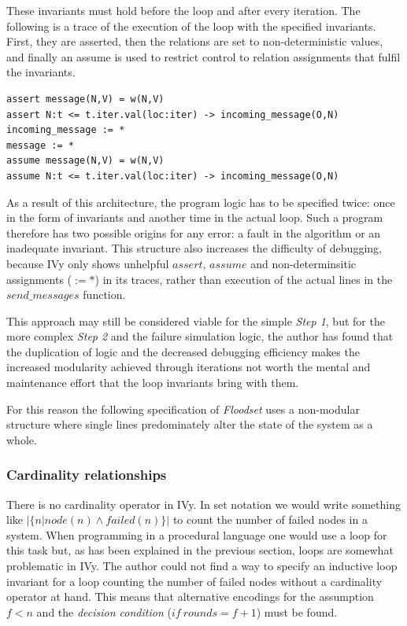\documentclass[fleqn]{article}
\begin{document}
These invariants must hold before the loop and after every iteration. The following is a trace of the execution of the loop with the specified invariants. First, they are asserted, then the relations are set to non-deterministic values, and finally an assume is used to restrict control to relation assignments that fulfil the invariants.

\begin{mdframed}[nobreak=true, backgroundcolor=light-gray, roundcorner=10pt,leftmargin=1, rightmargin=1, innerleftmargin=15, innertopmargin=15,innerbottommargin=15, outerlinewidth=1, linecolor=light-gray]
\begin{lstlisting}
assert message(N,V) = w(N,V)
assert N:t <= t.iter.val(loc:iter) -> incoming_message(O,N)
incoming_message := *
message := *
assume message(N,V) = w(N,V)
assume N:t <= t.iter.val(loc:iter) -> incoming_message(O,N)
\end{lstlisting}
\end{mdframed}

As a result of this architecture, the program logic has to be specified twice: once in the form of invariants and another time in the actual loop. Such a program therefore has two possible origins for any error: a fault in the algorithm or an inadequate invariant. This structure also increases the difficulty of debugging, because IVy only shows unhelpful $assert$, $assume$ and  non-determinsitic assignments ($:= *$) in its traces, rather than execution of the actual lines in the $send\_messages$ function.

This approach may still be considered viable for the simple \textit{Step 1}, but for the more complex \textit{Step 2} and the failure simulation logic, the author has found that the duplication of logic and the decreased debugging efficiency makes the increased modularity achieved through iterations not worth the mental and maintenance effort that the loop invariants bring with them.

For this reason the following specification of \textit{Floodset} uses a non-modular structure where single lines predominately alter the state of the system as a whole.


\subsubsection{Cardinality relationships}
There is no cardinality operator in IVy. In set notation we would write something like $|\{n|node(n) \land failed(n)\}|$ to count the number of failed nodes in a system. When programming in a procedural language one would use a loop for this task but, as has been explained in the previous section, loops are somewhat problematic in IVy. The author could not find a way to specify an inductive loop invariant for a loop counting the number of failed nodes without a cardinality operator at hand. This means that alternative encodings for the assumption $f<n$ and the \textit{decision condition} ($if\ rounds = f+1$) must be found.
\end{document}
